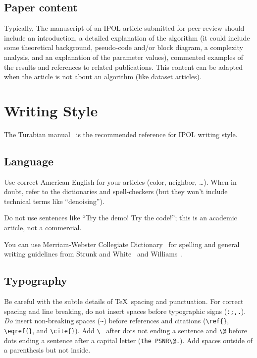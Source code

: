\documentclass{ipol}
\begin{document}
\subsection{Paper content}
Typically, The manuscript of an IPOL article submitted for peer-review should include an introduction, a detailed explanation of the algorithm (it  could include some theoretical background, pseudo-code and/or block diagram, a complexity analysis, and an explanation of the parameter values), commented examples of the results and references to related publications. This content can be adapted when the article is not about an algorithm (like dataset articles).


\section{Writing Style}

The Turabian manual~\cite{turabian} is the recommended reference for
IPOL writing style.

\subsection{Language}

Use correct American English for your articles (color, neighbor,
\ldots{}). When in doubt, refer to the dictionaries and spell-checkers
(but they won't include technical terms like ``denoising'').

Do not use sentences like ``Try the demo! Try the code!''; this
is an academic article, not a commercial.

You can use Merriam-Webster Collegiate
Dictionary~\cite{merriam-webster} for spelling and general writing
guidelines from Strunk and White~\cite{strunk-white} and
Williams~\cite{williams}.

\subsection{Typography}

Be careful with the subtle details of \TeX\ spacing and
punctuation. For correct spacing and line breaking, do not insert
spaces before typographic signs (\verb|:;,.|). \emph{Do} insert
non-breaking spaces (\verb|~|) before references and citations
(\verb|\ref{}|, \verb|\eqref{}|, and \verb|\cite{}|). Add \verb|\ |
after dots not ending a sentence and \verb|\@| before dots ending a
sentence after a capital letter (\verb|the PSNR\@.|). Add spaces
outside of a parenthesis but not inside.
\end{document}
